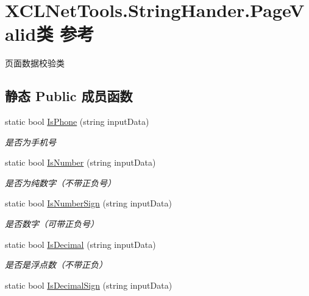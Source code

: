 \hypertarget{class_x_c_l_net_tools_1_1_string_hander_1_1_page_valid}{\section{X\-C\-L\-Net\-Tools.\-String\-Hander.\-Page\-Valid类 参考}
\label{class_x_c_l_net_tools_1_1_string_hander_1_1_page_valid}
}


页面数据校验类  


\subsection*{静态 Public 成员函数}
\begin{DoxyCompactItemize}
\item 
static bool \hyperlink{class_x_c_l_net_tools_1_1_string_hander_1_1_page_valid_aeb849c3d8a38a3ef6a5eea5097d2abc0}{Is\-Phone} (string input\-Data)
\begin{DoxyCompactList}\small\item\em 是否为手机号 \end{DoxyCompactList}\item 
static bool \hyperlink{class_x_c_l_net_tools_1_1_string_hander_1_1_page_valid_a5ef94c663cc81c8380957575ef31b11e}{Is\-Number} (string input\-Data)
\begin{DoxyCompactList}\small\item\em 是否为纯数字（不带正负号） \end{DoxyCompactList}\item 
static bool \hyperlink{class_x_c_l_net_tools_1_1_string_hander_1_1_page_valid_a91c3575738db7370e02e7698ef909695}{Is\-Number\-Sign} (string input\-Data)
\begin{DoxyCompactList}\small\item\em 是否数字（可带正负号） \end{DoxyCompactList}\item 
static bool \hyperlink{class_x_c_l_net_tools_1_1_string_hander_1_1_page_valid_aa118db22190ca7a7821c56a6240d0faf}{Is\-Decimal} (string input\-Data)
\begin{DoxyCompactList}\small\item\em 是否是浮点数（不带正负） \end{DoxyCompactList}\item 
static bool \hyperlink{class_x_c_l_net_tools_1_1_string_hander_1_1_page_valid_a9ff1027a295262204a6adb0276177989}{Is\-Decimal\-Sign} (string input\-Data)

\end{DoxyCompactItemize}
